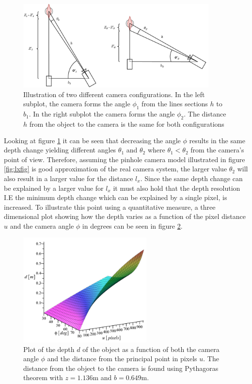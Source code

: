 \begin{figure}[h]
    \centering
    \includegraphics[width=0.9\textwidth]{figures/reconstruction/variationangle.pdf}
    \caption{Illustration of two different camera configurations. In the left subplot, the camera forms the angle $\phi_{1}$ from the lines sections $h$ to $b_{1}$. In the right subplot the camera forms the angle $\phi_{2}$. The distance $h$ from the object to the camera is the same for both configurations}
    \label{fig:variationangle}
\end{figure}

Looking at figure \ref{fig:variationangle} it can be seen that decreasing the angle $\phi$ results in the same depth change yielding different angles $\theta_{1}$ and $\theta_{2}$ where $\theta_{1} < \theta_{2}$ from the camera's point of view. Therefore, assuming the pinhole camera model illustrated in figure \ref{fig:lxfig} is good approximation of the real camera system, the larger value $\theta_{2}$ will also result in a larger value for the distance $l_{x}$. Since the same depth change can be explained by a larger value for $l_{x}$ it must also hold that the depth resolution I.E the minimum depth change which can be explained by a single pixel, is increased. To illustrate this point using a quantitative measure, a three dimensional plot showing how the depth varies as a function of the pixel distance $u$ and the camera angle $\phi$ in degrees can be seen in figure \ref{fig:maplefig1}.\\   

\begin{figure}[H]
    \centering
    \includegraphics[width=0.6\textwidth]{figures/reconstruction/maplefig1_crop.pdf}
    \caption{Plot of the depth $d$ of the object as a function of both the camera angle $\phi$ and the distance from the principal point in pixels $u$. The distance from the object to the camera is found using Pythagoras theorem with $z = 1.136$m and $b=0.649$m.}
    \label{fig:maplefig1}
\end{figure}

